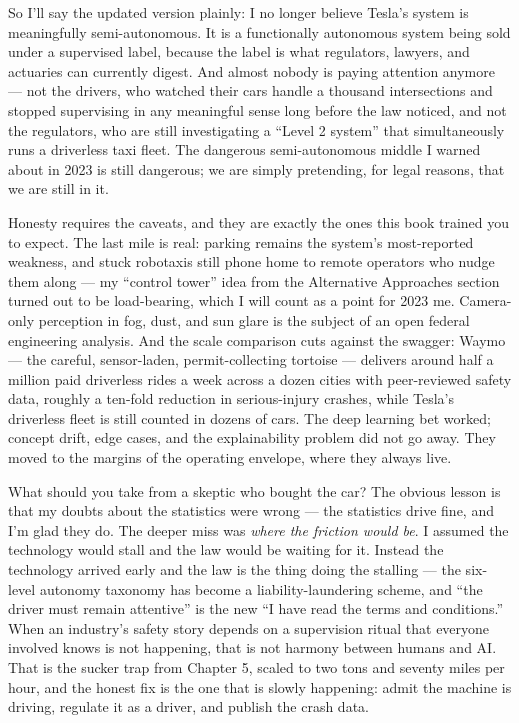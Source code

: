 So I'll say the updated version plainly: I no longer believe Tesla's system is meaningfully semi-autonomous. It is a functionally autonomous system being sold under a supervised label, because the label is what regulators, lawyers, and actuaries can currently digest. And almost nobody is paying attention anymore --- not the drivers, who watched their cars handle a thousand intersections and stopped supervising in any meaningful sense long before the law noticed, and not the regulators, who are still investigating a ``Level 2 system'' that simultaneously runs a driverless taxi fleet. The dangerous semi-autonomous middle I warned about in 2023 is still dangerous; we are simply pretending, for legal reasons, that we are still in it.

Honesty requires the caveats, and they are exactly the ones this book trained you to expect. The last mile is real: parking remains the system's most-reported weakness, and stuck robotaxis still phone home to remote operators who nudge them along --- my ``control tower'' idea from the Alternative Approaches section turned out to be load-bearing, which I will count as a point for 2023 me. Camera-only perception in fog, dust, and sun glare is the subject of an open federal engineering analysis. And the scale comparison cuts against the swagger: Waymo --- the careful, sensor-laden, permit-collecting tortoise --- delivers around half a million paid driverless rides a week across a dozen cities with peer-reviewed safety data, roughly a ten-fold reduction in serious-injury crashes, while Tesla's driverless fleet is still counted in dozens of cars. The deep learning bet worked; concept drift, edge cases, and the explainability problem did not go away. They moved to the margins of the operating envelope, where they always live.

What should you take from a skeptic who bought the car? The obvious lesson is that my doubts about the statistics were wrong --- the statistics drive fine, and I'm glad they do. The deeper miss was \textit{where the friction would be}. I assumed the technology would stall and the law would be waiting for it. Instead the technology arrived early and the law is the thing doing the stalling --- the six-level autonomy taxonomy has become a liability-laundering scheme, and ``the driver must remain attentive'' is the new ``I have read the terms and conditions.'' When an industry's safety story depends on a supervision ritual that everyone involved knows is not happening, that is not harmony between humans and AI. That is the sucker trap from Chapter 5, scaled to two tons and seventy miles per hour, and the honest fix is the one that is slowly happening: admit the machine is driving, regulate it as a driver, and publish the crash data.

